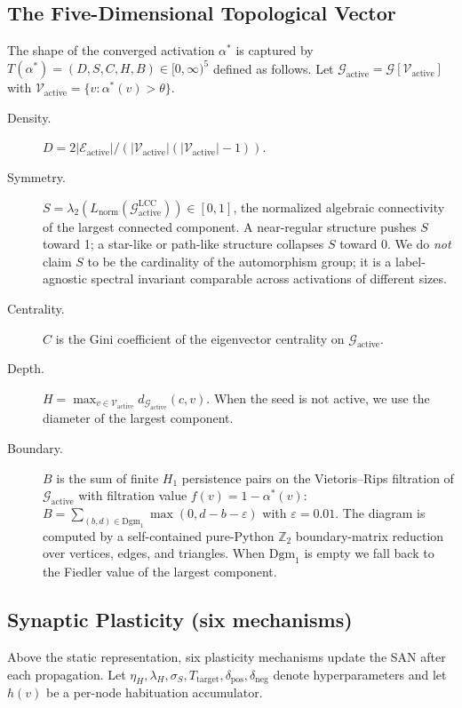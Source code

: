 \documentclass{article}
\begin{document}
\subsection{The Five-Dimensional Topological Vector}
The shape of the converged activation $\alpha^*$ is captured by
$T(\alpha^*) = (D, S, C, H, B) \in [0, \infty)^5$ defined as follows. Let
$\mathcal{G}_{\text{active}} = \mathcal{G}[\mathcal{V}_{\text{active}}]$
with $\mathcal{V}_{\text{active}} = \{v : \alpha^*(v) > \theta\}$.
\begin{description}
    \item[Density.] $D = 2|\mathcal{E}_{\text{active}}| /
      (|\mathcal{V}_{\text{active}}| (|\mathcal{V}_{\text{active}}| - 1))$.
    \item[Symmetry.] $S = \lambda_2(L_{\text{norm}}
      (\mathcal{G}_{\text{active}}^{\text{LCC}})) \in [0, 1]$, the
      normalized algebraic connectivity of the largest connected component.
      A near-regular structure pushes $S$ toward 1; a star-like or path-like
      structure collapses $S$ toward 0. We do \emph{not} claim $S$ to be the
      cardinality of the automorphism group; it is a label-agnostic spectral
      invariant comparable across activations of different sizes.
    \item[Centrality.] $C$ is the Gini coefficient of the eigenvector
      centrality on $\mathcal{G}_{\text{active}}$.
    \item[Depth.] $H = \max_{v \in \mathcal{V}_{\text{active}}}
      d_{\mathcal{G}_{\text{active}}}(c, v)$. When the seed is not active,
      we use the diameter of the largest component.
    \item[Boundary.] $B$ is the sum of finite $H_1$ persistence pairs on the
      Vietoris--Rips filtration of $\mathcal{G}_{\text{active}}$ with
      filtration value $f(v) = 1 - \alpha^*(v)$:
      $B = \sum_{(b, d) \in \mathrm{Dgm}_1} \max(0, d - b - \varepsilon)$
      with $\varepsilon = 0.01$. The diagram is computed by a self-contained
      pure-Python $\mathbb{Z}_2$ boundary-matrix reduction over vertices,
      edges, and triangles. When $\mathrm{Dgm}_1$ is empty we fall back to
      the Fiedler value of the largest component.
\end{description}

\subsection{Synaptic Plasticity (six mechanisms)}
Above the static representation, six plasticity mechanisms update the SAN
after each propagation. Let $\eta_H, \lambda_H, \sigma_S, T_{\text{target}},
\delta_{\text{pos}}, \delta_{\text{neg}}$ denote hyperparameters and let
$h(v)$ be a per-node habituation accumulator.
\end{document}
